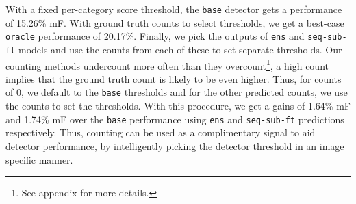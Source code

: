 \documentclass[10pt,twocolumn,letterpaper]{article}
\newcommand{\sub}{\texttt{aso-sub}\xspace}
\newcommand{\seq}{\texttt{seq-sub}\xspace}
\newcommand{\ens}{\texttt{ens}\xspace}
\begin{document}
With a fixed per-category score threshold, the \texttt{base} detector gets a performance of 15.26\% mF. With ground truth counts to select thresholds, we get a best-case \texttt{oracle} performance of 20.17\%. Finally, we pick the outputs of \ens and \seq{}\texttt{-ft} models and use the counts from each of these to set separate thresholds. Our counting methods undercount more often than they overcount\footnote{See appendix
for more details.}, a high count implies that the ground truth count is likely to be even higher. Thus, for counts of 0, we default to the \texttt{base} thresholds and for the other predicted counts, we use the counts to set the thresholds. With this procedure, we get a gains of 1.64\% mF and 1.74\% mF over the \texttt{base} performance using \ens and \seq{}\texttt{-ft} predictions respectively. Thus, counting can be used as a complimentary signal to aid detector performance, by intelligently picking the detector threshold in an image specific manner.
\begin{comment}
\begin{figure}
\texttt{[image: figures/deepdream]}
\caption{Deepdream images for category ``cow", with \sub{} outputs. We find that as we continue iterations for the category ``cow", the counts for related categories also go up when using \sub.}
\label{fig:deepdream}
\vspace{-15pt}
\end{figure}

\subsection{Counting on Deep Dreams}
We use the DeepDream\footnote{Code: http://googleresearch.blogspot.com/2015/07/deepdream-code-example-for-visualizing.html, details in supplementary} framework to generate ``cow" images from a starting ``sky" image. As generation iterations proceed for ``cow", we find that the counts for ``cow'' increase. However, what is interesting is that counts for related categories like ``sheep" also increase along with the counts for ``cow" (Figure.~\ref{fig:deepdream}). This indicates that \sub{} has learnt part-like features which could be contributing to count. 
\end{comment}
\end{document}
